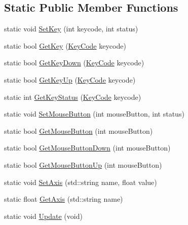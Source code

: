 \subsection*{Static Public Member Functions}
\begin{DoxyCompactItemize}
\item 
static void \mbox{\hyperlink{class_beer_engine_1_1_input_a8c64719adc226a57caf45ce63a0dddee}{Set\+Key}} (int keycode, int status)
\item 
static bool \mbox{\hyperlink{class_beer_engine_1_1_input_aef391d62eeafff68a8b33d232e38c324}{Get\+Key}} (\mbox{\hyperlink{namespace_beer_engine_a94f0b552f6dc910de8cdb44207981f53}{Key\+Code}} keycode)
\item 
static bool \mbox{\hyperlink{class_beer_engine_1_1_input_ab3093c905099025b3dcd0c67dc31ed82}{Get\+Key\+Down}} (\mbox{\hyperlink{namespace_beer_engine_a94f0b552f6dc910de8cdb44207981f53}{Key\+Code}} keycode)
\item 
static bool \mbox{\hyperlink{class_beer_engine_1_1_input_aace9501b3e8bde001dc46dea904504b0}{Get\+Key\+Up}} (\mbox{\hyperlink{namespace_beer_engine_a94f0b552f6dc910de8cdb44207981f53}{Key\+Code}} keycode)
\item 
static int \mbox{\hyperlink{class_beer_engine_1_1_input_a36af1091a677481607d7a197585fd379}{Get\+Key\+Status}} (\mbox{\hyperlink{namespace_beer_engine_a94f0b552f6dc910de8cdb44207981f53}{Key\+Code}} keycode)
\item 
static void \mbox{\hyperlink{class_beer_engine_1_1_input_a8761deb95726518ed5871a38aca6451d}{Set\+Mouse\+Button}} (int mouse\+Button, int status)
\item 
static bool \mbox{\hyperlink{class_beer_engine_1_1_input_a5f1cf046547a086a7f44d7c18ad6776d}{Get\+Mouse\+Button}} (int mouse\+Button)
\item 
static bool \mbox{\hyperlink{class_beer_engine_1_1_input_ad04218c44ce0ef21ed6a5cf65259653f}{Get\+Mouse\+Button\+Down}} (int mouse\+Button)
\item 
static bool \mbox{\hyperlink{class_beer_engine_1_1_input_a82dc5f380752307d5cb5b284488da5ef}{Get\+Mouse\+Button\+Up}} (int mouse\+Button)
\item 
static void \mbox{\hyperlink{class_beer_engine_1_1_input_af7f3c17ce4e2483d03a169894e06851d}{Set\+Axis}} (std\+::string name, float value)
\item 
static float \mbox{\hyperlink{class_beer_engine_1_1_input_ac21c03c4b7d417941034e935af481f2c}{Get\+Axis}} (std\+::string name)
\item 
static void \mbox{\hyperlink{class_beer_engine_1_1_input_a8a5a3a1a4b5fdedf20fc66c40d8e98bb}{Update}} (void)
\end{DoxyCompactItemize}
